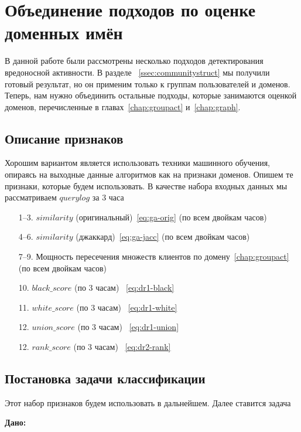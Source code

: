 \documentclass[14pt]{extreport}
\begin{document}
	\chapter{Объединение подходов по оценке доменных имён}
	В данной работе были рассмотрены несколько подходов детектирования вредоносной активности. В разделе ~\ref{ssec:communitystruct} мы получили готовый результат, но он применим только к группам пользователей и доменов. Теперь, нам нужно объединить остальные подходы, которые занимаются оценкой доменов, перечисленные в главах~\ref{chap:groupact} и~\ref{chap:graph}.
	
	\section{Описание признаков}
	\label{sec:desc-features}
	Хорошим вариантом является использовать техники машинного обучения, опираясь на выходные данные алгоритмов как на признаки доменов. Опишем те признаки, которые будем использовать. В качестве набора входных данных мы рассматриваем $querylog$ за 3 часа
	\begin{enumerate}
		\item [1--3.] $similarity$ (оригинальный)~\eqref{eq:ga-orig}  (по всем двойкам часов)
		\item [4--6.]$similarity$ (джаккард)~\eqref{eq:ga-jacc} (по всем двойкам часов)
		\item [7--9.] Мощность пересечения множеств клиентов по домену~\eqref{chap:groupact} (по всем двойкам часов)
		\item [10.] $black\_score$ (по 3 часам) ~\eqref{eq:dr1-black}
		\item [11.] $white\_score$ (по 3 часам) ~\eqref{eq:dr1-white}
		\item [12.] $union\_score$ (по 3 часам) ~\eqref{eq:dr1-union}
		\item [12.] $rank\_score$ (по 3 часам) ~\eqref{eq:dr2-rank}
		
	\end{enumerate}
	\section{Постановка задачи классификации}
	Этот набор признаков будем использовать в дальнейшем. Далее ставится задача
	
	{\bf
    Дано:
	}
\end{document}
